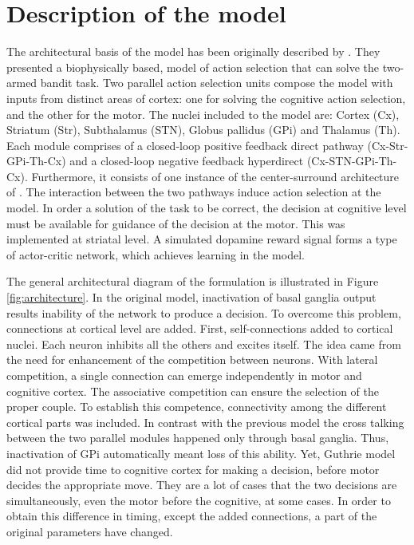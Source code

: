 \section{Description of the model}

	The architectural basis of the model has been originally described by \citet{Guthrie2013}. They presented a biophysically based, model of action selection that can solve the two-armed bandit task. Two parallel action selection units compose the model with inputs from distinct areas of cortex: one for solving the cognitive action selection, and the other for the motor. The nuclei included to the model are: Cortex (Cx), Striatum (Str), Subthalamus (STN), Globus pallidus (GPi) and Thalamus (Th). Each module comprises of a closed-loop positive feedback direct pathway (Cx-Str-GPi-Th-Cx) and a closed-loop negative feedback hyperdirect (Cx-STN-GPi-Th-Cx). Furthermore, it consists of one instance of the center-surround architecture of \citet{Mink1996}. The interaction between the two pathways induce action selection at the model. In order a solution of the task to be correct, the decision at  cognitive level must be available for guidance of the decision at the motor. This was implemented at striatal level. A simulated dopamine reward signal forms a type of actor-critic network, which achieves learning in the model.

	The general architectural diagram of the formulation is illustrated in Figure \ref{fig:architecture}. In the original model, inactivation of basal ganglia output results inability of the network to produce a decision. To overcome this problem, connections at cortical level are added. 
	First, self-connections added to cortical nuclei. Each neuron inhibits all the others and excites itself. The idea came from the need for enhancement of the competition between neurons.
	 With lateral competition, a single connection can emerge independently in motor and cognitive cortex. The associative competition  can ensure the selection of the proper couple. To establish this competence, connectivity 	among the different cortical parts was included. In contrast with the previous model the cross talking between the two parallel modules happened only through basal ganglia. Thus, inactivation of GPi automatically meant loss of this ability. 
	Yet,  Guthrie model did not provide time to cognitive cortex for making a decision, before motor  decides the appropriate move. They are a lot of cases that the two decisions are simultaneously, even the motor before the cognitive, at some cases. In order to obtain this difference in timing, except the added connections, a part of the original parameters have changed. 
	
